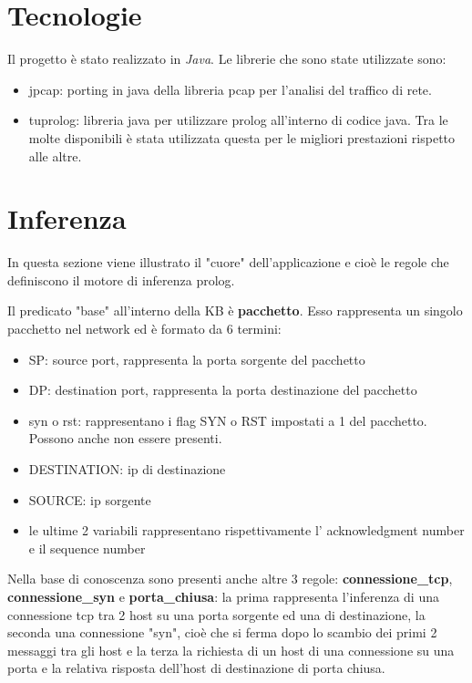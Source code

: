 \documentclass[a4paper,12pt]{article} %
\begin{document}
\section{Tecnologie}

Il progetto è stato realizzato in \emph{Java}. Le librerie che sono state utilizzate sono:


\begin{itemize}

\item jpcap: porting in java della libreria pcap per l'analisi del traffico di rete.

\item tuprolog: libreria java per utilizzare prolog all'interno di codice java. Tra le molte disponibili
è stata utilizzata questa per le migliori prestazioni rispetto alle altre.

\end{itemize}


\section{Inferenza}

In questa sezione viene illustrato il "cuore" dell'applicazione e cioè le regole che definiscono
il motore di inferenza prolog.



\label{Inferenza}


Il predicato "base" all'interno della KB è \textbf{pacchetto}.
Esso rappresenta un singolo pacchetto nel network
ed è formato da 6 termini:

\begin{itemize}
\item SP: source port, rappresenta la porta sorgente del pacchetto	
\item DP: destination port, rappresenta la porta destinazione del pacchetto
\item syn o rst: rappresentano i flag SYN o RST impostati a 1 del pacchetto. Possono anche non essere presenti.
\item DESTINATION: ip di destinazione
\item SOURCE: ip sorgente
\item le ultime 2 variabili rappresentano rispettivamente l' acknowledgment number e il sequence number
\end{itemize}


Nella base di conoscenza sono presenti anche altre 3 regole: \textbf{connessione\_tcp}, \textbf{connessione\_syn} e \textbf{porta\_chiusa}: 
la prima rappresenta l'inferenza di una connessione tcp tra 2 host su una porta sorgente ed una di destinazione, la seconda
una connessione "syn", cioè che si ferma dopo lo scambio dei primi 2 messaggi tra gli host e la terza la richiesta di un host di una connessione su una porta e la relativa risposta dell'host di destinazione
di porta chiusa.
\end{document}
